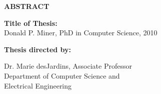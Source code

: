 \newpage
\pagestyle{empty}

\begin{center}
\vspace{0.1in}
\large{\bf ABSTRACT} \par  
\bigskip \bigskip
\end{center}

\begin{flushleft}
{\bf Title of Thesis:} \thesistitle\\
Donald P. Miner, PhD in Computer Science, 2010 \\
\begin{singlespace}
{\bf Thesis directed by:}{\hspace{2.5mm}} \parbox[t]{3in}{Dr. Marie desJardins, Associate Professor\\
Department of Computer Science and \\ Electrical Engineering}
\end{singlespace}
\end{flushleft}

